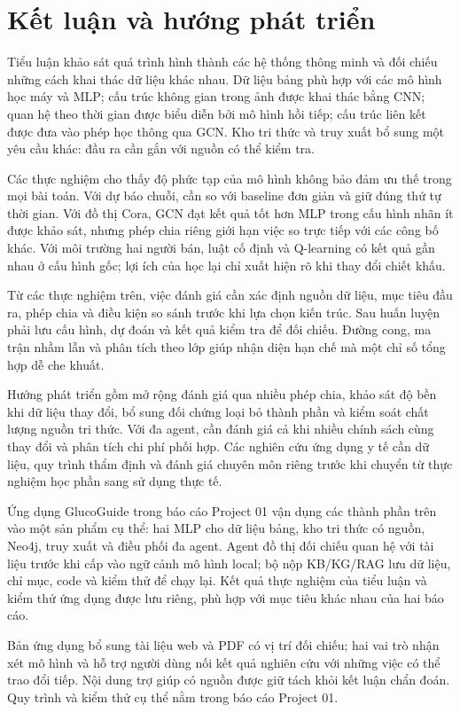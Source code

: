 \chapter*{Kết luận và hướng phát triển}
Tiểu luận khảo sát quá trình hình thành các hệ thống thông minh và đối chiếu những cách khai thác dữ liệu khác nhau. Dữ liệu bảng phù hợp với các mô hình học máy và MLP; cấu trúc không gian trong ảnh được khai thác bằng CNN; quan hệ theo thời gian được biểu diễn bởi mô hình hồi tiếp; cấu trúc liên kết được đưa vào phép học thông qua GCN. Kho tri thức và truy xuất bổ sung một yêu cầu khác: đầu ra cần gắn với nguồn có thể kiểm tra.

Các thực nghiệm cho thấy độ phức tạp của mô hình không bảo đảm ưu thế trong mọi bài toán. Với dự báo chuỗi, cần so với baseline đơn giản và giữ đúng thứ tự thời gian. Với đồ thị Cora, GCN đạt kết quả tốt hơn MLP trong cấu hình nhãn ít được khảo sát, nhưng phép chia riêng giới hạn việc so trực tiếp với các công bố khác. Với môi trường hai người bán, luật cố định và Q-learning có kết quả gần nhau ở cấu hình gốc; lợi ích của học lại chỉ xuất hiện rõ khi thay đổi chiết khấu.

Từ các thực nghiệm trên, việc đánh giá cần xác định nguồn dữ liệu, mục tiêu đầu ra, phép chia và điều kiện so sánh trước khi lựa chọn kiến trúc. Sau huấn luyện phải lưu cấu hình, dự đoán và kết quả kiểm tra để đối chiếu. Đường cong, ma trận nhầm lẫn và phân tích theo lớp giúp nhận diện hạn chế mà một chỉ số tổng hợp dễ che khuất.

Hướng phát triển gồm mở rộng đánh giá qua nhiều phép chia, khảo sát độ bền khi dữ liệu thay đổi, bổ sung đối chứng loại bỏ thành phần và kiểm soát chất lượng nguồn tri thức. Với đa agent, cần đánh giá cả khi nhiều chính sách cùng thay đổi và phân tích chi phí phối hợp. Các nghiên cứu ứng dụng y tế cần dữ liệu, quy trình thẩm định và đánh giá chuyên môn riêng trước khi chuyển từ thực nghiệm học phần sang sử dụng thực tế.

Ứng dụng GlucoGuide trong báo cáo Project 01 vận dụng các thành phần trên vào một sản phẩm cụ thể: hai MLP cho dữ liệu bảng, kho tri thức có nguồn, Neo4j, truy xuất và điều phối đa agent. Agent đồ thị đối chiếu quan hệ với tài liệu trước khi cấp vào ngữ cảnh mô hình local; bộ nộp KB/KG/RAG lưu dữ liệu, chỉ mục, code và kiểm thử để chạy lại. Kết quả thực nghiệm của tiểu luận và kiểm thử ứng dụng được lưu riêng, phù hợp với mục tiêu khác nhau của hai báo cáo.

Bản ứng dụng bổ sung tài liệu web và PDF có vị trí đối chiếu; hai vai trò nhận xét mô hình và hỗ trợ người dùng nối kết quả nghiên cứu với những việc có thể trao đổi tiếp. Nội dung trợ giúp có nguồn được giữ tách khỏi kết luận chẩn đoán. Quy trình và kiểm thử cụ thể nằm trong báo cáo Project 01.
